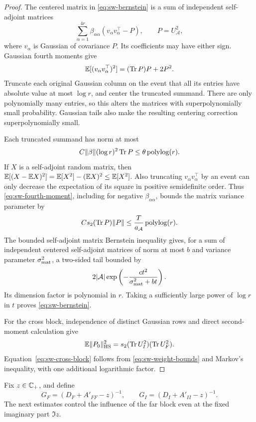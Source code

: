 \begin{proof}
The centered matrix in \eqref{eq:sw-bernstein} is a sum of independent
self-adjoint matrices
\[
 \sum_{\alpha=1}^{4r}\beta_{\alpha\alpha}
       (v_\alpha v_\alpha^\top-P),\qquad P=U_{\mathcal A}^2,
\]
where \(v_\alpha\) is Gaussian of covariance \(P\).
Its coefficients may have either sign. Gaussian fourth moments give
\begin{equation}\label{eq:sw-fourth-moment}
 \mathbb E[(v_\alpha v_\alpha^\top)^2]
   =(\operatorname{Tr} P)P+2P^2.
\end{equation}
Truncate each original Gaussian column on the event that all its entries
have absolute value at most \(\log r\), and center the truncated summand.
There are only polynomially many entries, so this alters the matrices with
superpolynomially small probability. Gaussian tails also make the resulting
centering correction superpolynomially small.

Each truncated summand has norm at most
\[
 C\|\beta\|(\log r)^2\operatorname{Tr} P
 \le \theta\operatorname{polylog}(r).
\]
If \(X\) is a self-adjoint random matrix, then
\(\mathbb E[(X-\mathbb E X)^2]=\mathbb E[X^2]-(\mathbb E X)^2\le\mathbb E[X^2]\).
Also truncating \(v_\alpha v_\alpha^\top\) by an event can only decrease
the expectation of its square in positive semidefinite order.
Thus \eqref{eq:sw-fourth-moment}, including for negative
\(\beta_{\alpha\alpha}\), bounds the matrix variance parameter by
\[
 C s_2(\operatorname{Tr} P)\|P\|
 \le \frac{T}{a_{\mathcal A}}\operatorname{polylog}(r).
\]
The bounded self-adjoint matrix Bernstein inequality
\citep[Theorem~1.4]{Tropp} gives, for a sum of independent centered
self-adjoint matrices of norm at most \(b\) and variance parameter
\(\sigma_{\rm mat}^2\), a two-sided tail bounded by
\[
 2|\mathcal A|\exp\left(
 -\frac{c t^2}{\sigma_{\rm mat}^2+bt}\right).
\]
Its dimension factor is polynomial in \(r\). Taking a sufficiently large
power of \(\log r\) in \(t\) proves \eqref{eq:sw-bernstein}.

For the cross block, independence of distinct Gaussian rows and direct
second-moment calculation give
\[
 \mathbb E\|P_0\|_{\mathrm{HS}}^2
 =s_2(\operatorname{Tr} U_I^2)(\operatorname{Tr} U_F^2).
\]
Equation~\eqref{eq:sw-cross-block} follows from
\eqref{eq:sw-weight-bounds} and Markov's inequality, with one additional
logarithmic factor.
\end{proof}

Fix \(z\in\mathbb C_+\), and define
\[
 G_F=(D_F+A'_{FF}-z)^{-1},\qquad
 G_I=(D_I+A'_{II}-z)^{-1}.
\]
The next estimates control the influence of the far block even at the fixed
imaginary part \(\Im z\).

